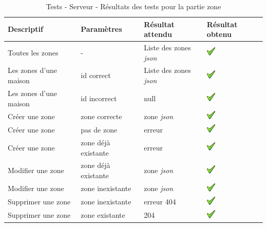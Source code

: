 \begin{table}[H]
\begin{tabularx}{\textwidth}{|X|X|X|X|}
  \hline
  \bf{Descriptif} & \bf{Paramètres} & \bf{Résultat attendu} & \bf{Résultat obtenu}\\
  \hline
  Toutes les zones & - & Liste des zones \emph{\gls{json}} & \includegraphics[width=16px]{00_media/ok.png} \\
  \hline
  Les zones d'une maison & id correct & Liste des zones \emph{\gls{json}} & \includegraphics[width=16px]{00_media/ok.png} \\
  \hline
  Les zones d'une maison & id incorrect & null  & \includegraphics[width=16px]{00_media/ok.png} \\
  \hline  
 Créer une zone & zone correcte & zone \emph{\gls{json}} & \includegraphics[width=16px]{00_media/ok.png} \\
  \hline 
  Créer une zone & pas de zone & erreur & \includegraphics[width=16px]{00_media/ok.png} \\
  \hline 
  Créer une zone & zone déjà existante & erreur & \includegraphics[width=16px]{00_media/ok.png} \\
  \hline 
  Modifier une zone & zone déjà existante & zone \emph{\gls{json}} & \includegraphics[width=16px]{00_media/ok.png} \\
  \hline
  Modifier une zone & zone inexistante & zone \emph{\gls{json}} & \includegraphics[width=16px]{00_media/ok.png} \\
  \hline
  Supprimer une zone & zone inexistante & erreur 404  & \includegraphics[width=16px]{00_media/ok.png} \\
  \hline
  Supprimer une zone & zone existante & 204 & \includegraphics[width=16px]{00_media/ok.png} \\
  \hline
\end{tabularx}
\caption{Tests - Serveur - Résultats des tests pour la partie zone}
\label{tab:stestZone}
\end{table}

